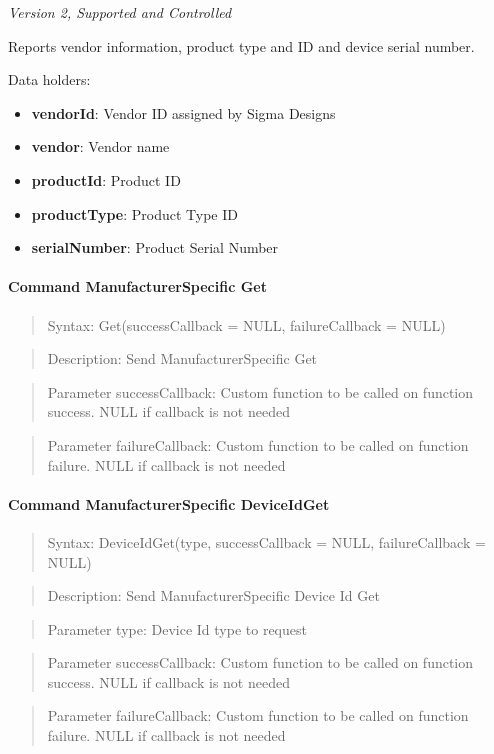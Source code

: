 \textit{Version 2, Supported and Controlled}
\newline

Reports vendor information, product type and ID and device serial number.
\newline

\noindent
Data holders:

\begin{itemize}
\item \textbf{vendorId}: Vendor ID assigned by Sigma Designs
\item \textbf{vendor}: Vendor name
\item \textbf{productId}: Product ID
\item \textbf{productType}: Product Type ID
\item \textbf{serialNumber}: Product Serial Number
\end{itemize}

\paragraph{Command ManufacturerSpecific Get}
\begin{quote}Syntax: Get(successCallback = NULL, failureCallback = NULL)\end{quote}
\begin{quote}Description: Send ManufacturerSpecific Get\end{quote}
\begin{quote}Parameter successCallback: Custom function to be called on function success. NULL if callback is not needed\end{quote}
\begin{quote}Parameter failureCallback: Custom function to be called on function failure. NULL if callback is not needed\end{quote}


\paragraph{Command ManufacturerSpecific DeviceIdGet}
\begin{quote}Syntax: DeviceIdGet(type, successCallback = NULL, failureCallback = NULL)\end{quote}
\begin{quote}Description: Send ManufacturerSpecific Device Id Get\end{quote}
\begin{quote}Parameter type: Device Id type to request\end{quote}
\begin{quote}Parameter successCallback: Custom function to be called on function success. NULL if callback is not needed\end{quote}
\begin{quote}Parameter failureCallback: Custom function to be called on function failure. NULL if callback is not needed\end{quote}



